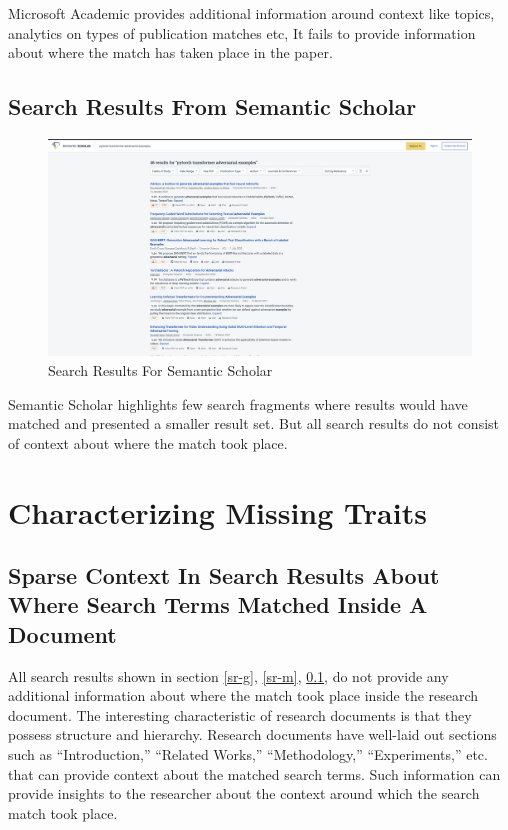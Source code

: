 Microsoft Academic provides additional information around context like topics, analytics on types of publication matches etc,
It fails to provide information about where the match has taken place in the paper.

\pagebreak
\subsection{Search Results From Semantic Scholar}
\label{sr-s}
\begin{figure}[h]
    \centering
    \includegraphics[width=\maxwidth{\textwidth}]{src/images/ss-example.png}
    \caption{Search Results For Semantic Scholar}
    \label{figure\arabic{figurecounter}}
\end{figure}
Semantic Scholar highlights few search fragments where results would have matched and presented a smaller result set. 
But all search results do not consist of context about where the match took place. 

\pagebreak
\section{Characterizing Missing Traits}
\label{section:intro:missing_traits}

\subsection{Sparse Context In Search Results About Where Search Terms Matched Inside A Document}

All search results shown in section \ref{sr-g}, \ref{sr-m}, \ref{sr-s}, do not provide any additional information about where the match took place inside the research document. The interesting characteristic of research documents is that they possess structure and hierarchy. Research documents have well-laid out sections such as “Introduction,” “Related Works,” “Methodology,” “Experiments,” etc. that can provide context about the matched search terms. Such information can provide insights to the researcher about the context around which the search match took place. 

